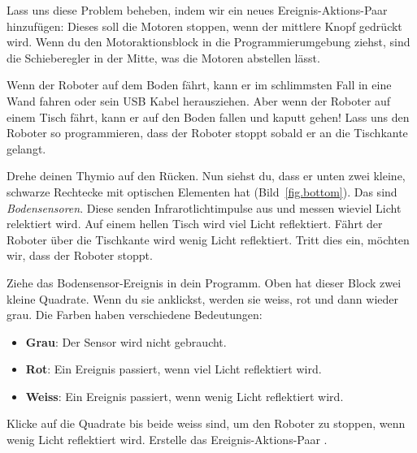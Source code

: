 Lass uns diese Problem beheben, indem wir ein neues Ereignis-Aktions-Paar
hinzufügen: Dieses soll die Motoren stoppen, wenn der mittlere Knopf gedrückt wird. Wenn du den Motoraktionsblock in die Programmierumgebung ziehst, sind die Schieberegler in der Mitte, was die Motoren abstellen lässt.


Wenn der Roboter auf dem Boden fährt, kann er im schlimmsten Fall in eine Wand
fahren oder sein USB Kabel herausziehen. Aber wenn der Roboter auf einem Tisch
fährt, kann er auf den Boden fallen und kaputt gehen! Lass uns den Roboter so
programmieren, dass der Roboter stoppt sobald er an die Tischkante gelangt.


Drehe deinen Thymio auf den Rücken. Nun siehst du, dass er unten zwei
kleine, schwarze Rechtecke mit optischen Elementen hat (Bild~\ref{fig.bottom}).
Das sind \emph{Bodensensoren}. Diese senden Infrarotlichtimpulse aus und messen wieviel Licht relektiert wird. 
Auf einem hellen Tisch wird viel Licht reflektiert. Fährt der Roboter über die Tischkante wird wenig Licht reflektiert. Tritt dies ein, möchten wir, dass der Roboter stoppt.


Ziehe das Bodensensor-Ereignis  in dein Programm. Oben hat
dieser Block zwei kleine Quadrate. Wenn du sie anklickst, werden sie weiss, rot
und dann wieder grau. Die Farben haben verschiedene Bedeutungen:

\begin{itemize}
\item \textbf{Grau}: Der Sensor wird nicht gebraucht.
\item \textbf{Rot}: Ein Ereignis passiert, wenn viel Licht reflektiert wird.
\item \textbf{Weiss}: Ein Ereignis passiert, wenn wenig Licht reflektiert wird. 
\end{itemize}


Klicke auf die Quadrate bis beide weiss sind, um den Roboter zu stoppen, wenn
wenig Licht reflektiert wird. Erstelle das Ereignis-Aktions-Paar
.

